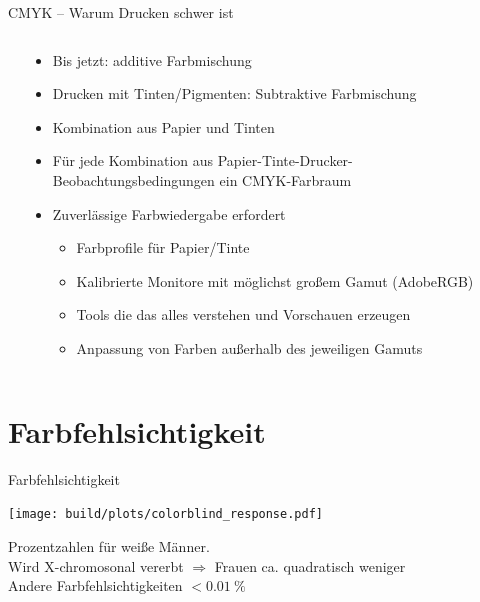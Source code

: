 \documentclass[aspectratio=1610, 9pt]{beamer}
\begin{document}
\begin{frame}{CMYK – Warum Drucken schwer ist}
  \begin{columns}[c, onlytextwidth]%
    \begin{column}{0.35\textwidth}%
      \begin{tikzpicture}[scale=0.66]
        
      \end{tikzpicture}
    \end{column}
    \begin{column}{0.6\textwidth}%
      \begin{itemize}
        \item Bis jetzt: additive Farbmischung
        \item Drucken mit Tinten/Pigmenten: Subtraktive Farbmischung
        \item Kombination aus Papier und Tinten
        \item Für jede Kombination aus Papier-Tinte-Drucker-Beobachtungsbedingungen
          ein CMYK-Farbraum
        \item Zuverlässige Farbwiedergabe erfordert
          \begin{itemize}
            \item Farbprofile für Papier/Tinte
            \item Kalibrierte Monitore mit möglichst großem Gamut (AdobeRGB)
            \item Tools die das alles verstehen und Vorschauen erzeugen
            \item Anpassung von Farben außerhalb des jeweiligen Gamuts
          \end{itemize}
      \end{itemize}
    \end{column}%
  \end{columns}%
\end{frame}%


\section{Farbfehlsichtigkeit}
\begin{frame}[t]{Farbfehlsichtigkeit}
  \begin{center}
    \texttt{[image: build/plots/colorblind\_response.pdf]}
  \end{center}
  
  Prozentzahlen für weiße Männer. \\
  Wird X-chromosonal vererbt ${}⇒{}$ Frauen ca. quadratisch weniger\\
  Andere Farbfehlsichtigkeiten ${}< \SI{0.01}{\percent}$
\end{frame}
\end{document}
